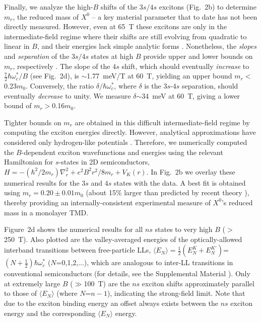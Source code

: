\documentclass[aps,prl,twocolumn]{revtex4-1}
\begin{document}
Finally, we analyze the high-$B$ shifts of the $3s/4s$ excitons (Fig.~2b) to determine $m_r$, the reduced mass of $X^0$ -- a key material parameter that to date has not been directly measured. However, even at 65~T these excitons are only in the intermediate-field regime where their shifts are still evolving from quadratic to linear in $B$, and their energies lack simple analytic forms \cite{Miura, Knox, Hasegawa, Ritchie, Edelstein}. Nonetheless, the \emph{slopes} and \emph{separation} of the $3s/4s$ states at high $B$ provide upper and lower bounds on $m_r$, respectively \cite{SM}. The slope of the $4s$ shift, which should eventually \textit{increase} to $\frac{7}{2}\hbar \omega_c^* / B$ (see Fig.~2d), is $\sim$1.77~meV/T at 60~T, yielding an upper bound $m_r$$<$0.23$m_0$.  Conversely, the ratio $\delta/\hbar \omega_c^*$, where $\delta$ is the $3s$-$4s$ separation, should eventually \textit{decrease} to unity.  We measure $\delta$$\sim$34~meV at 60~T, giving a lower bound of $m_r$$>$0.16$m_0$. 

Tighter bounds on $m_r$ are obtained in this difficult intermediate-field regime by computing the exciton energies directly. However, analytical approximations have considered only hydrogen-like potentials \cite{Hasegawa, Ritchie}. Therefore, we numerically computed \cite{SM} the $B$-dependent exciton wavefunctions and energies using the relevant Hamiltonian for $s$-states in 2D semiconductors, $H = -(\hbar^2/2m_r)\nabla_r^2 + e^2 B^2 r^2/8m_r + V_K(r)$. In Fig.~2b we overlay these numerical results for the $3s$ and $4s$ states with the data.  A best fit is obtained using $m_r = 0.20 \pm 0.01 m_0$ (about 15\% larger than predicted by recent theory \cite{Berkelbach, Kyla}), thereby providing an internally-consistent experimental measure of $X^0$'s reduced mass in a monolayer TMD. 

Figure~2d shows the numerical results for all $ns$ states to very high $B$ ($>$250~T). Also plotted are the valley-averaged energies of the optically-allowed interband transitions between free-particle LLs, $\langle E_N \rangle = \frac{1}{2}(E_N^K + E_N^{K'})$=$(N + \frac{1}{2})\hbar \omega_c^*$ ($N$=0,1,2,...), which are analogous to inter-LL transitions in conventional semiconductors (for details, see the Supplemental Material \cite{SM}).  Only at extremely large $B$ ($\gg$100~T) are the $ns$ exciton shifts approximately parallel to those of $\langle E_N \rangle$ (where $N$=$n-1$), indicating the strong-field limit. Note that due to the exciton binding energy an offset always exists between the $ns$ exciton energy and the corresponding $\langle E_N \rangle$ energy. 
\end{document}
